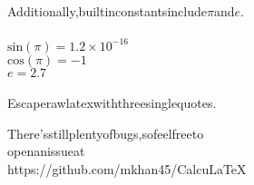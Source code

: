 \documentclass{article}
\begin{document}
Additionally,builtinconstantsinclude$\pi$and$e$.
\\\\$\text{sin}(\pi)=1.2\times10^{-16}$\\
$\text{cos}(\pi)=-1$\\
$e=2.7$\\
\\
Escaperawlatexwiththreesinglequotes.

There'sstillplentyofbugs,sofeelfreeto\\
openanissueat\\
https://github.com/mkhan45/CalcuLaTeX
\\
\end{document}
